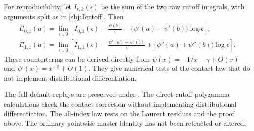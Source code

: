 For reproducibility, let $I_{r,k}(\epsilon)$ be the sum of the two raw cutoff integrals, with arguments split as in \eqref{shj:Jcutoff}. Then
\begin{align}
\Pi_{0,1}(a)=\lim_{\epsilon\downarrow0}\left[
I_{0,1}(\epsilon)-\frac{\psi(b)}\epsilon
-\big(\psi'(a)-\psi'(b)\big)\log\epsilon\right],\label{shj:cut01}\\
\Pi_{1,1}(a)=\lim_{\epsilon\downarrow0}\left[
I_{1,1}(\epsilon)-\frac{\psi'(a)+\psi'(b)}\epsilon
+\big(\psi''(a)+\psi''(b)\big)\log\epsilon\right].\label{shj:cut11}
\end{align}
These counterterms can be derived directly from $\psi(x)=-1/x-\gamma+O(x)$ and $\psi'(x)=x^{-2}+O(1)$. They give numerical tests of the contact law that do not implement distributional differentiation.


The full default replays are preserved under .
The direct cutoff polygamma calculations check the contact correction
without implementing distributional differentiation. The all-index law
rests on the Laurent residues and the proof above. The ordinary pointwise
master identity has not been retracted or altered.
